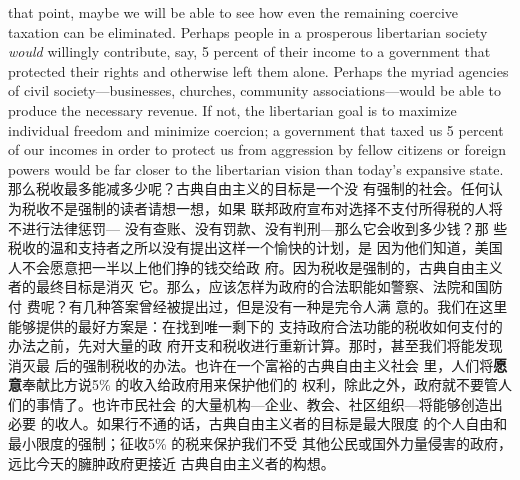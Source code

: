 \begin{paracol}{2}
that point, maybe we will be able to see how even the remaining coercive taxation can be eliminated. Perhaps people in a
prosperous libertarian society \textit{would} willingly contribute, say, 5
percent of their income to a government that protected their
rights and otherwise left them alone. Perhaps the myriad agencies of civil society---businesses, churches, community associations---would be able to produce the necessary revenue. If not,
the libertarian goal is to maximize individual freedom and minimize coercion; a government that taxed us 5 percent of our incomes in order to protect us from aggression by fellow citizens
or foreign powers would be far closer to the libertarian vision
than today's expansive state.
\switchcolumn
那么税收最多能减多少呢？古典自由主义的目标是一个没
有强制的社会。任何认为税收不是强制的读者请想一想，如果
联邦政府宣布对选择不支付所得税的人将不进行法律惩罚---
没有查账、没有罚款、没有判刑---那么它会收到多少钱？那
些税收的温和支持者之所以没有提出这样一个愉快的计划，是
因为他们知道，美国人不会愿意把一半以上他们挣的钱交给政
府。因为税收是强制的，古典自由主义者的最终目标是消灭
它。那么，应该怎样为政府的合法职能如警察、法院和国防付
费呢？有几种答案曾经被提出过，但是没有一种是完令人满
意的。我们在这里能够提供的最好方案是：在找到唯一剩下的
支持政府合法功能的税收如何支付的办法之前，先对大量的政
府开支和税收进行重新计算。那时，甚至我们将能发现消灭最
后的强制税收的办法。也许在一个富裕的古典自由主义社会
里，人们将\textbf{愿意}奉献比方说5\% 的收入给政府用来保护他们的
权利，除此之外，政府就不要管人们的事情了。也许市民社会
的大量机构---企业、教会、社区组织---将能够创造出必要
的收人。如果行不通的话，古典自由主义者的目标是最大限度
的个人自由和最小限度的强制；征收5\% 的税来保护我们不受
其他公民或国外力量侵害的政府，远比今天的臃肿政府更接近
古典自由主义者的构想。



\end{paracol}
